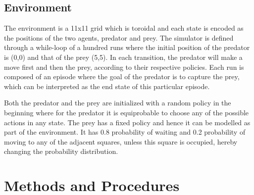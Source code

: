 \documentclass[paper=a4, fontsize=11pt]{scrartcl}
\numberwithin{equation}{section}		%
\numberwithin{figure}{section}			%
\numberwithin{table}{section}				%
\begin{document}
\subsection{Environment}
\label{environment}
The environment is a 11x11 grid which is toroidal and each state is encoded as the positions of the two agents, predator and prey.
The simulator is defined through a while-loop of a hundred runs where the initial position of the predator is (0,0) and that of the prey (5,5). In each transition, the predator will make a move first and then the prey, according to their respective policies. Each run is composed of an episode where the goal of the predator is to capture the prey, which can be interpreted as the end state of this particular episode. 

Both the predator and the prey are initialized with a random policy in the beginning where for the predator it is equiprobable to choose any of the possible actions %
in any state. The prey has a fixed policy and hence it can be modelled as part of the environment. It has 0.8 probability of waiting and 0.2 probability of moving to any of the adjacent squares, unless this square is occupied, hereby changing the probability distribution.

\section{Methods and Procedures}
\label{methods}
\end{document}
